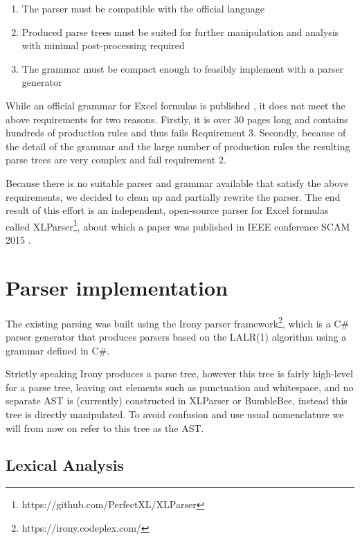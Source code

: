 \begin{enumerate}
\label{sec:designgoals}
\item The parser must be compatible with the official language
\item Produced parse trees must be suited for further manipulation and analysis with minimal post-processing required
\item The grammar must be compact enough to feasibly implement with a parser generator
\end{enumerate}

While an official grammar for Excel formulas is published \cite{ExcelOfficialGrammar}, it does not meet the above requirements for two reasons.
Firstly, it is over 30 pages long and contains hundreds of production rules and thus fails Requirement 3.
Secondly, because of the detail of the grammar and the large number of production rules the resulting parse trees are very complex and fail requirement 2.

Because there is no suitable parser and grammar available that satisfy the above requirements, we decided to clean up and partially rewrite the parser.
The end result of this effort is an independent, open-source parser for Excel formulas called XLParser\footnote{https://github.com/PerfectXL/XLParser}, about which a paper was published in IEEE conference SCAM 2015 \cite{xlparser}.

\section{Parser implementation}

The existing parsing was built using the Irony parser framework\footnote{https://irony.codeplex.com/}, which is a C\# parser generator that produces parsers based on the LALR(1) algorithm using a grammar defined in C\#.

Strictly speaking Irony produces a parse tree, however this tree is fairly high-level for a parse tree, leaving out elements such as punctuation and whitespace, and no separate AST is (currently) constructed in XLParser or BumbleBee, instead this tree is directly manipulated.
To avoid confusion and use usual nomenclature we will from now on refer to this tree as the AST.

\subsection{Lexical Analysis}
\label{sec:lexanalysis}

